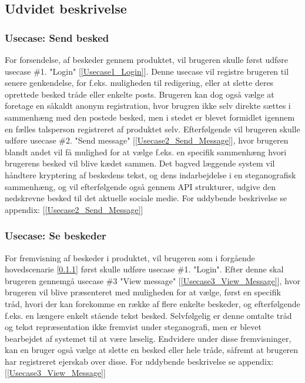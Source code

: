 \subsection{Udvidet beskrivelse}
\subsubsection{Usecase: Send besked}
\label{Hovedscenarie1}
For forsendelse, af beskeder gennem produktet, vil brugeren skulle først udføre usecase \#1. "Login" [\ref{Usecase1_Login}]. Denne usecase vil registre brugeren til senere genkendelse, for f.eks. muligheden til redigering, eller at slette deres oprettede besked tråde eller enkelte posts. Brugeren kan dog også vælge at foretage en såkaldt anonym registration, hvor brugren ikke selv direkte sættes i sammenhæng med den postede besked, men i stedet er blevet formidlet igennem en fælles talsperson registreret af produktet selv. Efterfølgende vil brugeren skulle udføre usecase \#2. "Send message" [\ref{Usecase2_Send_Message}], hvor brugeren blandt andet vil få mulighed for at vælge f.eks. en specifik sammenhæng hvori brugerens besked vil blive kædet sammen. Det bagved læggende system vil håndtere kryptering af beskedens tekst, og dens indarbejdelse i en steganografisk sammenhæng, og vil efterfølgende også gennem API strukturer, udgive den nedskrevne besked til det aktuelle sociale medie. For uddybende beskrivelse se appendix: [\ref{Usecase2_Send_Message}]

\subsubsection{Usecase: Se beskeder}
\label{Hovedscenarie2}
For fremvisning af beskeder i produktet, vil brugeren som i forgående hovedscenarie [\ref{Hovedscenarie1}] først skulle udføre usecase \#1. "Login". Efter denne skal brugeren gennemgå usecase \#3 "View message" [\ref{Usecase3_View_Message}], hvor brugeren vil blive præsenteret med muligheden for at vælge, først en specifik tråd, hvori der kan forekomme en række af flere enkelte beskeder, og efterfølgende f.eks. en længere enkelt stående tekst besked.
Selvfølgelig er denne omtalte tråd og tekst repræsentation ikke fremvist under steganografi, men er blevet bearbejdet af systemet til at være læselig.
Endvidere under disse fremvisninger, kan en bruger også vælge at slette en besked eller hele tråde, såfremt at brugeren har registreret ejerskab over disse. For uddybende beskrivelse se appendix: [\ref{Usecase3_View_Message}]

